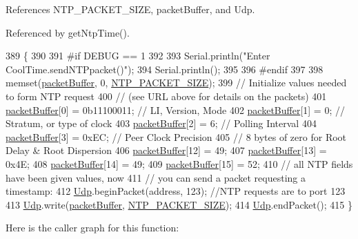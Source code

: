 References N\+T\+P\+\_\+\+P\+A\+C\+K\+E\+T\+\_\+\+S\+I\+ZE, packet\+Buffer, and Udp.



Referenced by get\+Ntp\+Time().


\begin{DoxyCode}
389 \{
390 
391 \textcolor{preprocessor}{#if DEBUG == 1 }
392 
393     Serial.println(\textcolor{stringliteral}{"Enter CoolTime.sendNTPpacket()"});
394     Serial.println();
395 
396 \textcolor{preprocessor}{#endif}
397 
398     memset(\hyperlink{classCoolTime_a27e6abc82a5c2f72161956967005bec7}{packetBuffer}, 0, \hyperlink{CoolTime_8h_a56a6ea64006651b4f42adf713e244f06}{NTP\_PACKET\_SIZE});
399     \textcolor{comment}{// Initialize values needed to form NTP request}
400     \textcolor{comment}{// (see URL above for details on the packets)}
401     \hyperlink{classCoolTime_a27e6abc82a5c2f72161956967005bec7}{packetBuffer}[0] = 0b11100011;   \textcolor{comment}{// LI, Version, Mode}
402     \hyperlink{classCoolTime_a27e6abc82a5c2f72161956967005bec7}{packetBuffer}[1] = 0;     \textcolor{comment}{// Stratum, or type of clock}
403     \hyperlink{classCoolTime_a27e6abc82a5c2f72161956967005bec7}{packetBuffer}[2] = 6;     \textcolor{comment}{// Polling Interval}
404     \hyperlink{classCoolTime_a27e6abc82a5c2f72161956967005bec7}{packetBuffer}[3] = 0xEC;  \textcolor{comment}{// Peer Clock Precision}
405     \textcolor{comment}{// 8 bytes of zero for Root Delay & Root Dispersion}
406     \hyperlink{classCoolTime_a27e6abc82a5c2f72161956967005bec7}{packetBuffer}[12]  = 49;
407     \hyperlink{classCoolTime_a27e6abc82a5c2f72161956967005bec7}{packetBuffer}[13]  = 0x4E;
408     \hyperlink{classCoolTime_a27e6abc82a5c2f72161956967005bec7}{packetBuffer}[14]  = 49;
409     \hyperlink{classCoolTime_a27e6abc82a5c2f72161956967005bec7}{packetBuffer}[15]  = 52;
410     \textcolor{comment}{// all NTP fields have been given values, now}
411     \textcolor{comment}{// you can send a packet requesting a timestamp:                 }
412     \hyperlink{classCoolTime_a4e23216a8121ca79d0fb019f30884b92}{Udp}.beginPacket(address, 123); \textcolor{comment}{//NTP requests are to port 123}
413     \hyperlink{classCoolTime_a4e23216a8121ca79d0fb019f30884b92}{Udp}.write(\hyperlink{classCoolTime_a27e6abc82a5c2f72161956967005bec7}{packetBuffer}, \hyperlink{CoolTime_8h_a56a6ea64006651b4f42adf713e244f06}{NTP\_PACKET\_SIZE});
414     \hyperlink{classCoolTime_a4e23216a8121ca79d0fb019f30884b92}{Udp}.endPacket(); 
415 \}
\end{DoxyCode}
Here is the caller graph for this function\+:
